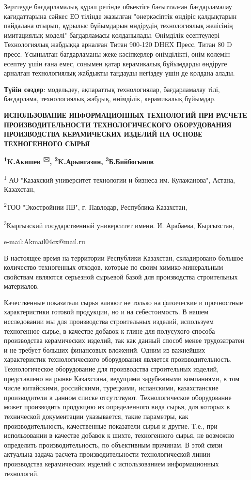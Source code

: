 Зерттеуде бағдарламалық құрал ретінде объектіге бағытталған
бағдарламалау қағидаттарына сәйкес ЕО тілінде жазылған "өнеркәсіптік
өндіріс қалдықтарын пайдалана отырып, құрылыс бұйымдарын өндірудің
технологиялық желісінің имитациялық моделі" бағдарламасы қолданылады.
Өнімділік есептеулері Технологиялық жабдыққа арналған Титан 900-120 DHEX
Пресс, Титан 80 D пресс. Ұсынылған бағдарламаны жеке кәсіпкерлер
өнімділікті, өнім көлемін есептеу үшін ғана емес, сонымен қатар
керамикалық бұйымдарды өндіруге арналған технологиялық жабдықты таңдауды
негіздеу үшін де қолдана алады.

{\bfseries Түйін сөздер}: модельдеу, ақпараттық технологиялар,
бағдарламалау тілі, бағдарлама, технологиялық жабдық, өнімділік,
керамикалық бұйымдар.
\begin{center}

{\bfseries ИСПОЛЬЗОВАНИЕ ИНФОРМАЦИОННЫХ ТЕХНОЛОГИЙ ПРИ РАСЧЕТЕ
ПРОИЗВОДИТЕЛЬНОСТИ ТЕХНОЛОГИЧЕСКОГО ОБОРУДОВАНИЯ ПРОИЗВОДСТВА
КЕРАМИЧЕСКИХ ИЗДЕЛИЙ НА ОСНОВЕ ТЕХНОГЕННОГО СЫРЬЯ}

{\bfseries \textsuperscript{1}K.Акишев \textsuperscript{🖂},
\textsuperscript{2}K.Арынгазин, \textsuperscript{3}Б.Бийбосынов}

\textsuperscript{1} АО "Казахский университет технологии и бизнеса им.
Кулажанова", Астана, Казахстан,

\textsuperscript{2}ТОО "Экостройнии-ПВ", г. Павлодар, Республика
Казахстан,

\textsuperscript{3}Кыргызский государственный университет имени. И.
Арабаева, Кыргызстан,

e-mail:Akmail04cx@mail.ru
\end{center}

В настоящее время на территории Республики Казахстан, складировано
большое количество техногенных отходов, которые по своим
химико-минеральным свойствам являются серьезной сырьевой базой для
производства строительных материалов.

Качественные показатели сырья влияют не только на физические и
прочностные характеристики готовой продукции, но и на себестоимость. В
нашем исследовании мы для производства строительных изделий, используем
техногенное сырье, в качестве добавок к глине для полусухого способа
производства керамических изделий, так как данный способ менее
трудозатратен и не требует больших финансовых вложений. Одним из
важнейших характеристик технологического оборудования является
производительность. Технологическое оборудование для производства
строительных изделий, представлено на рынке Казахстана, ведущими
зарубежными компаниями, в том числе китайскими, российскими, турецкими,
испанскими, казахстанские производители в данном списке отсутствуют.
Технологическое оборудование может производить продукцию из
определенного вида сырья, для которых в технической документации
указывается, такие параметры, как производительность, качественные
показатели сырья и другие. Т.е., при использовании в качестве добавок к
шихте, техногенного сырья, не возможно определить производительность, по
объективным причинам. В этой связи актуальна задача расчета
производительности технологической линии производства керамических
изделий с использованием информационных технологий.

